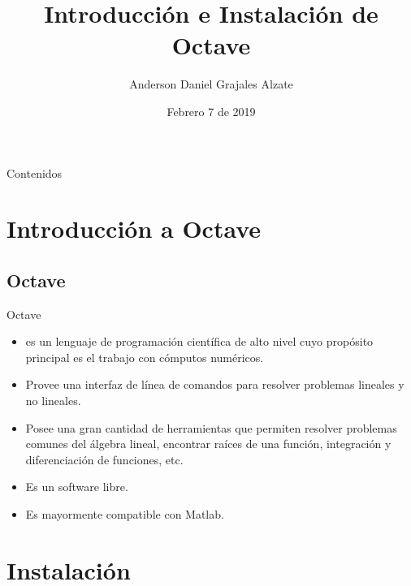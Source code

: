 \documentclass[12pt]{beamer}
\title[Octave]{Introducción e Instalación de Octave}
\author{Anderson Daniel Grajales Alzate}
\institute[Universidad EAFIT]
{Análisis Numérico / Procesos Numéricos \\ %
	\medskip
	\textit{agrajal7@eafit.edu.co} %
	
}
\date{Febrero 7 de 2019}
\begin{document}
	
	\begin{frame}
	\titlepage %
\end{frame}

\begin{frame}[allowframebreaks]{Contenidos}
\tableofcontents
\end{frame}



\section{Introducción a Octave}

\subsection{Octave} %

\begin{frame}{Octave}
\begin{itemize}
	\item {} es un lenguaje de programación científica de alto nivel cuyo propósito principal es el trabajo con cómputos numéricos. 
	\item Provee una interfaz de línea de comandos para resolver problemas lineales y no lineales.
	\item Posee una gran cantidad de herramientas que permiten resolver problemas comunes del álgebra lineal, encontrar raíces de una función, integración y diferenciación de funciones, etc.
	\item Es un software libre.
	\item Es mayormente compatible con Matlab. 
\end{itemize}
\end{frame}

\section{Instalación}
\end{document}
